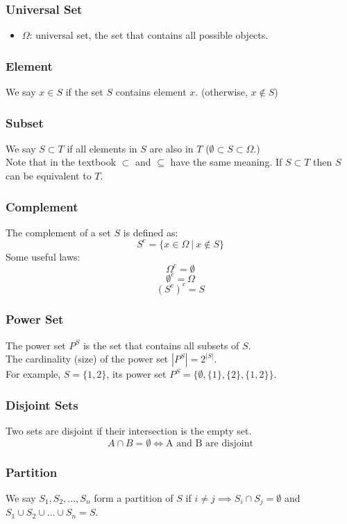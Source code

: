 \documentclass[11pt]{article}
\begin{document}
\subsubsection{Universal Set}
\begin{itemize}
  \item $\Omega$: universal set, the set that contains all possible objects.
\end{itemize}

\subsubsection{Element}
We say $x \in S$ if the set $S$ contains element $x$. (otherwise, $x \notin S$)

\subsubsection{Subset}
We say $S \subset T$ if all elements in $S$ are also in $T$ ($\emptyset \subset S \subset \Omega$.)
\\ \noindent Note that in the textbook $\subset$ and $\subseteq$ have the same meaning. If $S \subset T$ then $S$ can be equivalent to $T$.

\subsubsection{Complement}
The complement of a set $S$ is defined as:
$$ S^{c} = \{ x \in \Omega \: | \: x \notin S \} $$
Some useful laws:
 $$ \Omega^{c} = \emptyset $$
 $$ \emptyset^{c} = \Omega $$
 $$ (S^{c})^{c} = S $$
\subsubsection{Power Set}
The power set $P^{S}$ is the set that contains all subsets of $S$. \\
\noindent The cardinality (size) of the power set $|P^{S}| = 2^{|S|}$. \\
\noindent For example, $S = \{1,2\}$, its power set $P^{S} = \{\emptyset, \{1\}, \{2\}, \{1,2\} \}$.

\subsubsection{Disjoint Sets}
Two sets are disjoint if their intersection is the empty set.
$$ A \cap B = \emptyset \iff \text{A and B are disjoint}$$
\subsubsection{Partition}
We say $S_1, S_2, \ldots, S_n $ form a partition of $S$ if $i \neq j \implies S_i \cap S_j = \emptyset$ and $S_1 \cup S_2 \cup \ldots \cup S_n = S$.
\end{document}
